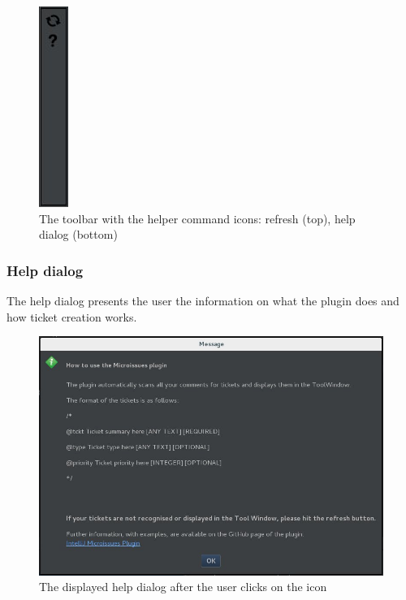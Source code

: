\documentclass{4thYearProject}
\begin{document}
\begin{figure}[H]
\includegraphics[scale=0.6]{Toolbar_figure}
\centering
\caption{The toolbar with the helper command icons: refresh (top), help dialog (bottom)}\label{toolbar}
\label{fig:toolbar}
\end{figure}

\subsubsection{Help dialog}

The help dialog presents the user the information on what the plugin does and how ticket creation works. 

\begin{figure}[H]
\includegraphics[scale=0.6]{HelpDialog}
\centering
\caption{The displayed help dialog after the user clicks on the icon}\label{helpdialog}
\label{fig:helpdialog}
\end{figure}

\end{document}
